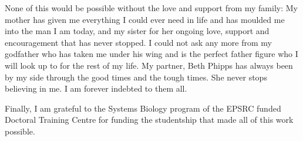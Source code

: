 \begin{acknowledgements}
None of this would be possible without the love and support from my family:
My mother has given me everything I could ever need in life and has moulded me into the man I am today, and my sister for her ongoing love, support and encouragement that has never stopped.
I could not ask any more from my godfather who has taken me under his wing and is the perfect father figure who I will look up to for the rest of my life.
My partner, Beth Phipps has always been by my side through the good times and the tough times.
She never stops believing in me.
I am forever indebted to them all.

Finally, I am grateful to the Systems Biology program of the EPSRC funded Doctoral Training Centre for funding the studentship that made all of this work possible.
\end{acknowledgements}
